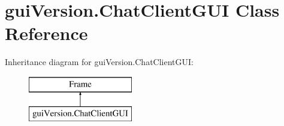 \hypertarget{classgui_version_1_1_chat_client_g_u_i}{}\section{gui\+Version.\+Chat\+Client\+G\+U\+I Class Reference}
\label{classgui_version_1_1_chat_client_g_u_i}
Inheritance diagram for gui\+Version.\+Chat\+Client\+G\+U\+I\+:\begin{figure}[H]
\begin{center}
\leavevmode
\includegraphics[height=2.000000cm]{classgui_version_1_1_chat_client_g_u_i}
\end{center}
\end{figure}
